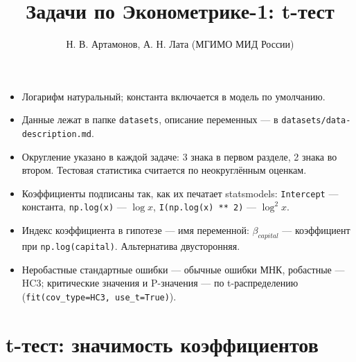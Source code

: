 \documentclass[
  russian,
]{article}
\title{Задачи по Эконометрике-1: t-тест}
\author{Н. В. Артамонов, А. Н. Лата (МГИМО МИД России)}
\date{}
\providecommand{\tightlist}{%
  \setlength{\itemsep}{0pt}\setlength{\parskip}{0pt}}
\renewcommand*\contentsname{Содержание}
\newcommand\contentsname{Содержание}
\begin{document}
\maketitle

\renewcommand*\contentsname{Содержание}
{
\setcounter{tocdepth}{3}
\tableofcontents
}

\begin{tcolorbox}[enhanced jigsaw, arc=.35mm, bottomrule=.15mm, bottomtitle=1mm, breakable, colback=white, colbacktitle=quarto-callout-important-color!10!white, colframe=quarto-callout-important-color-frame, coltitle=black, left=2mm, leftrule=.75mm, opacityback=0, opacitybacktitle=0.6, rightrule=.15mm, title=\textcolor{quarto-callout-important-color}{\faExclamation}\hspace{0.5em}{Важно}, titlerule=0mm, toprule=.15mm, toptitle=1mm]

\begin{itemize}
\tightlist
\item
  Логарифм натуральный; константа включается в модель по умолчанию.
\item
  Данные лежат в папке \texttt{datasets}, описание переменных --- в
  \texttt{datasets/data-description.md}.
\item
  Округление указано в каждой задаче: 3 знака в первом разделе, 2 знака
  во втором. Тестовая статистика считается по неокруглённым оценкам.
\item
  Коэффициенты подписаны так, как их печатает statsmodels:
  \texttt{Intercept} --- константа, \texttt{np.log(x)} --- \(\log x\),
  \texttt{I(np.log(x)\ **\ 2)} --- \(\log^2 x\).
\item
  Индекс коэффициента в гипотезе --- имя переменной: \(\beta_{capital}\)
  --- коэффициент при \texttt{np.log(capital)}. Альтернатива
  двусторонняя.
\item
  Неробастные стандартные ошибки --- обычные ошибки МНК, робастные ---
  HC3; критические значения и P-значения --- по t-распределению
  (\texttt{fit(cov\_type=\textquotesingle{}HC3\textquotesingle{},\ use\_t=True)}).
\end{itemize}

\end{tcolorbox}

\section{t-тест: значимость
коэффициентов}\label{t-ux442ux435ux441ux442-ux437ux43dux430ux447ux438ux43cux43eux441ux442ux44c-ux43aux43eux44dux444ux444ux438ux446ux438ux435ux43dux442ux43eux432}
\end{document}
